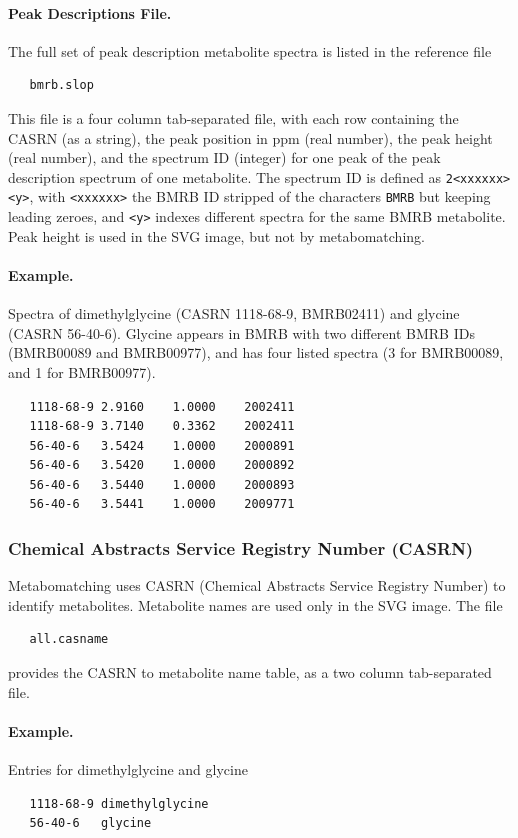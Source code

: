 \documentclass[a4paper,11pt]{article}
\begin{document}
\paragraph{Peak Descriptions File.} The full set of peak description metabolite spectra is listed in the reference file
\begin{verbatim}
   bmrb.slop
\end{verbatim}
This file is a four column tab-separated file, with each row containing the CASRN (as a string), the peak position in ppm (real number), the peak height (real number), and the spectrum ID (integer) for one peak of the peak description spectrum of one metabolite. The spectrum ID is defined as \verb|2<xxxxxx><y>|, with \verb|<xxxxxx>| the BMRB ID stripped of the characters \verb|BMRB| but keeping leading zeroes, and \verb|<y>| indexes different spectra for the same BMRB metabolite. Peak height is used in the SVG image, but not by metabomatching.
\paragraph{Example.} Spectra of dimethylglycine (CASRN 1118-68-9, BMRB02411) and glycine (CASRN 56-40-6). Glycine appears in BMRB with two different BMRB IDs (BMRB00089 and BMRB00977), and has four listed spectra (3 for BMRB00089, and 1 for BMRB00977).
\begin{verbatim}
   1118-68-9 2.9160    1.0000    2002411
   1118-68-9 3.7140    0.3362    2002411
   56-40-6   3.5424    1.0000    2000891
   56-40-6   3.5420    1.0000    2000892   
   56-40-6   3.5440    1.0000    2000893
   56-40-6   3.5441    1.0000    2009771
\end{verbatim}
\subsubsection{Chemical Abstracts Service Registry Number (CASRN)}
Metabomatching uses CASRN (Chemical Abstracts Service Registry Number) to identify metabolites. Metabolite names are used only in the SVG image. The file
\begin{verbatim}
   all.casname
\end{verbatim}
provides the CASRN to metabolite name table, as a two column tab-separated file.
\paragraph{Example.} Entries for dimethylglycine and glycine
\begin{verbatim}
   1118-68-9 dimethylglycine
   56-40-6   glycine
\end{verbatim}
\end{document}
